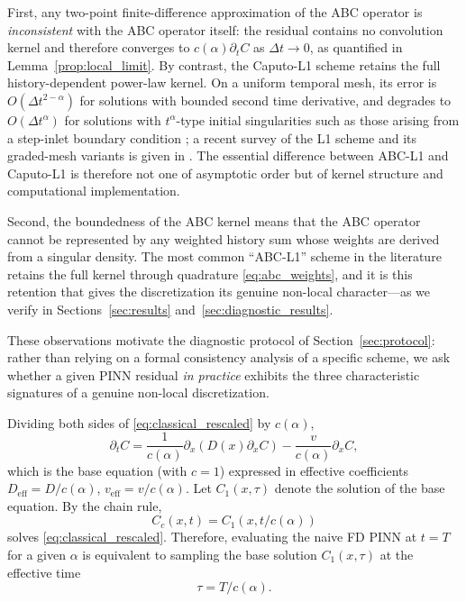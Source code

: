 \documentclass[11pt]{article}
\begin{document}
First, any two-point finite-difference approximation of the ABC operator
is \emph{inconsistent} with the ABC operator itself: the residual
contains no convolution kernel and therefore converges to
\(c(\alpha)\partial_t C\) as \(\Delta t \to 0\), as quantified in
Lemma~\ref{prop:local_limit}. By contrast, the Caputo-L1 scheme retains
the full history-dependent power-law kernel. On a uniform temporal mesh,
its error is \(O(\Delta t^{2-\alpha})\) for solutions with bounded
second time derivative, and degrades to \(O(\Delta t^{\alpha})\) for
solutions with \(t^\alpha\)-type initial singularities such as those
arising from a step-inlet boundary condition \cite{Stynes2017, Jin2016};
a recent survey of the L1 scheme and its graded-mesh variants is given
in \cite{Stynes2022, JinZhou2023}. The essential difference between
ABC-L1 and Caputo-L1 is therefore not one of asymptotic order but of
kernel structure and computational implementation.

Second, the boundedness of the ABC kernel means that the ABC operator
cannot be represented by any weighted history sum whose weights are
derived from a singular density. The most common ``ABC-L1'' scheme in
the literature retains the full kernel through quadrature
\eqref{eq:abc_weights}, and it is this retention that gives the
discretization its genuine non-local character---as we verify in
Sections~\ref{sec:results} and~\ref{sec:diagnostic_results}.

These observations motivate the diagnostic protocol of
Section~\ref{sec:protocol}: rather than relying on a formal
consistency analysis of a specific scheme, we ask whether a given
PINN residual \emph{in practice} exhibits the three characteristic
signatures of a genuine non-local discretization.

Dividing both sides of \eqref{eq:classical_rescaled} by \(c(\alpha)\),
\begin{equation}
\partial_t C = \frac{1}{c(\alpha)}\partial_x(D(x)\partial_x C) - \frac{v}{c(\alpha)}\partial_x C,
\end{equation}
which is the base equation (with \(c=1\)) expressed in effective coefficients \(D_{\mathrm{eff}} = D/c(\alpha)\), \(v_{\mathrm{eff}} = v/c(\alpha)\). Let \(C_1(x,\tau)\) denote the solution of the base equation. By the chain rule,
\begin{equation}
C_c(x,t) = C_1\!\left(x, t/c(\alpha)\right)
\label{eq:eff_time}
\end{equation}
solves \eqref{eq:classical_rescaled}. Therefore, evaluating the naive FD PINN at \(t=T\) for a given \(\alpha\) is equivalent to sampling the base solution \(C_1(x,\tau)\) at the effective time
\begin{equation}
\tau = T/c(\alpha).
\label{eq:tau}
\end{equation}
\end{document}
